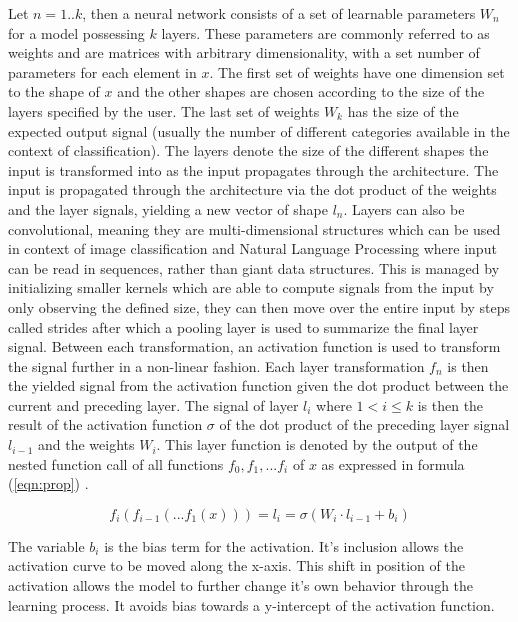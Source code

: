 Let $n = 1..k$, then a neural network consists of a set of learnable parameters $W_n$ for a model possessing $k$ layers. These parameters are commonly referred to as weights and are matrices with arbitrary dimensionality, with a set number of parameters for each element in $x$. The first set of weights have one dimension set to the shape of $x$ and the other shapes are chosen according to the size of the layers specified by the user. The last set of weights $W_k$ has the size of the expected output signal (usually the number of different categories available in the context of classification). The layers denote the size of the different shapes the input is transformed into as the input propagates through the architecture. The input is propagated through the architecture via the dot product of the weights and the layer signals, yielding a new vector of shape $l_n$. Layers can also be convolutional, meaning they are multi-dimensional structures which can be used in context of image classification and Natural Language Processing where input can be read in sequences, rather than giant data structures. This is managed by initializing smaller kernels which are able to compute signals from the input by only observing the defined size, they can then move over the entire input by steps called strides after which a pooling layer is used to summarize the final layer signal. Between each transformation, an activation function is used to transform the signal further in a non-linear fashion. Each layer transformation $f_n$ is then the yielded signal from the activation function given the dot product between the current and preceding layer. The signal of layer $l_i$ where $ 1 < i \leq k $ is then the result of the activation function $\sigma$ of the dot product of the preceding layer signal $l_{i-1}$ and the weights $W_i$. This layer function is denoted by the output of the nested function call of all functions $f_0, f_1, ... f_i$ of $x$ as expressed in formula (\ref{eqn:prop}) \cite{wang2003artificial}.

\begin{equation}
\label{eqn:prop}
f_i(f_{i-1}(...f_1(x))) = l_i = \sigma(W_i \cdot l_{i-1} + b_i)
\end{equation}

The variable $b_i$ is the bias term for the activation. It's inclusion allows the activation curve to be moved along the x-axis. This shift in position of the activation allows the model to further change it's own behavior through the learning process. It avoids bias towards a y-intercept of the activation function.  

